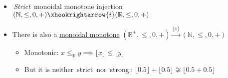 \begin{itemize}
    \item \,\emph{Strict}\, monoidal monotone injection $(\mathbb{N},\leq, 0, +) \xhookrightarrow{i} (\mathbb{R},\leq,0,+)$
    \item There is also a \hyperref[D2.41]{monoidal monotone} $(\mathbb{R}^+,\leq, 0, +) \xrightarrow{\lfloor x \rfloor} (\mathbb{N},\leq,0,+)$
          \begin{itemize}
            \item Monotonic: $x \leq_\mathbb{R} y \implies \lfloor x \rfloor \leq \lfloor y \rfloor$
            \item But it is neither \,strict\, nor \,strong\,: $\lfloor 0.5 \rfloor + \lfloor 0.5 \rfloor \not \cong \lfloor 0.5+0.5 \rfloor$
          \end{itemize}
  \end{itemize}
